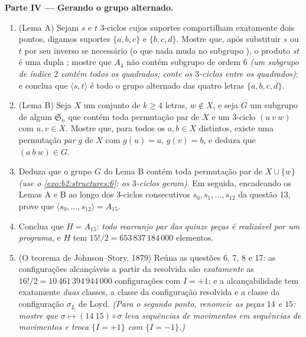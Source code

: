 \begin{problem}
\medskip
\noindent\textbf{Parte IV --- Gerando o grupo alternado.}
\begin{enumerate}[resume]
  \item (Lema A) Sejam $s$ e $t$ $3$-ciclos cujos suportes
        compartilham exatamente dois pontos, digamos suportes $\{a, b, c\}$ e
        $\{b, c, d\}$. Mostre que, após substituir $s$ ou $t$ por
        seu inverso se necessário (o que nada muda no subgrupo
        ), o produto $st$ é uma dupla
        ; mostre que $A_4$ não contém subgrupo de
        ordem $6$ \emph{(um subgrupo de índice $2$ contém todos os
        quadrados; conte os $3$-ciclos entre os quadrados)}; e conclua
        que $\langle s, t\rangle$ é todo o grupo alternado
        das quatro letras $\{a, b, c, d\}$.
  \item (Lema B) Seja $X$ um conjunto de $k \geq 4$ letras, $w
        \notin X$, e seja $G$ um subgrupo de algum
        $\mathfrak{S}_n$ que contém toda permutação par de $X$
        e um $3$-ciclo $(u\ v\ w)$ com $u, v \in X$. Mostre que,
        para todos os $a, b \in X$ distintos, existe uma permutação
        \emph{par} $g$ de $X$ com $g(u) = a$, $g(v) = b$, e
        deduza que $(a\ b\ w) \in G$.
  \item Deduza que o grupo $G$ do Lema B contém toda permutação
        par de $X \cup \{w\}$ \emph{(use o
        \cref{exo:b2:structures:6}: os $3$-ciclos geram)}.
        Em seguida, encadeando os Lemas A e B ao longo dos
        $3$-ciclos consecutivos $s_0, s_1, \dots, s_{12}$ da questão 13,
        prove que $\langle s_0, \dots, s_{12}\rangle = A_{15}$.
  \item Conclua que $H = A_{15}$: \emph{todo rearranjo par
        das quinze peças é realizável por um programa}, e $H$
        tem $15!/2 = 653\,837\,184\,000$ elementos.
  \item (O teorema de Johnson--Story, 1879) Reúna as questões 6,
        7, 8 e 17: as configurações alcançáveis a partir da resolvida
        são \emph{exatamente} as $16!/2 =
        10\,461\,394\,944\,000$ configurações com $I = +1$;
        e a alcançabilidade tem exatamente \emph{duas} classes, a classe
        da configuração resolvida e a classe da configuração
        $\sigma_L$ de Loyd. \emph{(Para o segundo ponto, renomeie as peças
        $14$ e $15$: mostre que $\sigma \mapsto (14\ 15) \circ
        \sigma$ leva sequências de movimentos em sequências de movimentos e
        troca $\{I = +1\}$ com $\{I = -1\}$.)}
\end{enumerate}


\end{problem}
